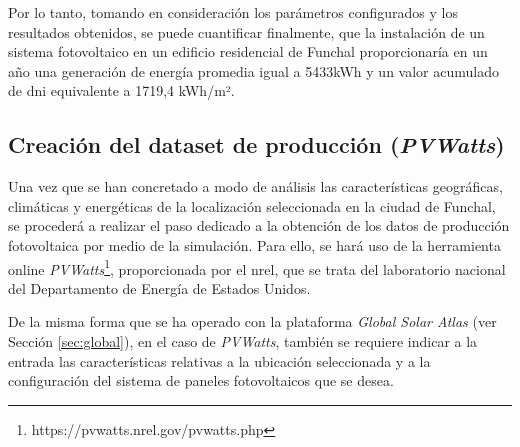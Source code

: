 \pagebreak

Por lo tanto, tomando en consideración los parámetros configurados y los resultados obtenidos, se puede cuantificar finalmente, que la instalación de un sistema fotovoltaico en un edificio residencial de Funchal proporcionaría en un año una generación de energía promedia igual a 5433kWh y un valor acumulado de \gls{dni} equivalente a 1719,4 kWh/m².

\vspace{3mm}







\subsection{Creación del dataset de producción (\textit{PVWatts})}
\label{sec:pvw}

Una vez que se han concretado a modo de análisis las características geográficas, climáticas y energéticas de la localización seleccionada en la ciudad de Funchal, se procederá a realizar el paso dedicado a la obtención de los datos de producción fotovoltaica por medio de la simulación. Para ello, se hará uso de la herramienta online \textit{PVWatts}\footnote{https://pvwatts.nrel.gov/pvwatts.php}, proporcionada por el \gls{nrel}, que se trata del laboratorio nacional del Departamento de Energía de Estados Unidos. \cite{pvwatts}

\vspace{3mm}

De la misma forma que se ha operado con la plataforma \textit{Global Solar Atlas} (ver Sección \ref{sec:global}), en el caso de \textit{PVWatts}, también se requiere indicar a la entrada las características relativas a la ubicación seleccionada y a la configuración del sistema de paneles fotovoltaicos que se desea. 


